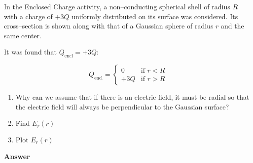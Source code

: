 \documentclass{article}
\begin{document}
In the Enclosed Charge activity, a non--conducting spherical shell of radius $R$ with a charge of $+3Q$ uniformly distributed on its surface was considered. Its cross--section is shown along with that of a Gaussian sphere of radius $r$ and the same center.

It was found that
$Q_{\text{encl}}=+3Q$:

$$
   Q_{\text{encl}} = \begin{cases}
     0   &\text{if } r < R \\
     +3Q &\text{if } r > R
   \end{cases}
   $$



\begin{enumerate}

  \item Why can we assume that if there is an electric field, it must be radial so that the electric field will always be perpendicular to the Gaussian surface?

  \item Find $E_r(r)$

  \item Plot $E_r(r)$

\end{enumerate}

\newpage

\textbf{Answer}


\end{document}
